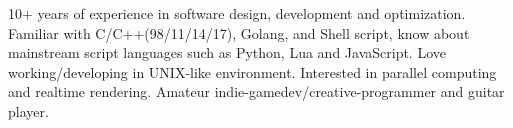 

\begin{cvparagraph}

10+ years of experience in software design, development and optimization. Familiar with C/C++(98/11/14/17), Golang, and Shell script, know about mainstream script languages such as Python, Lua and JavaScript. Love working/developing in UNIX-like environment. Interested in parallel computing and realtime rendering. Amateur indie-gamedev/creative-programmer and guitar player.
\end{cvparagraph}
